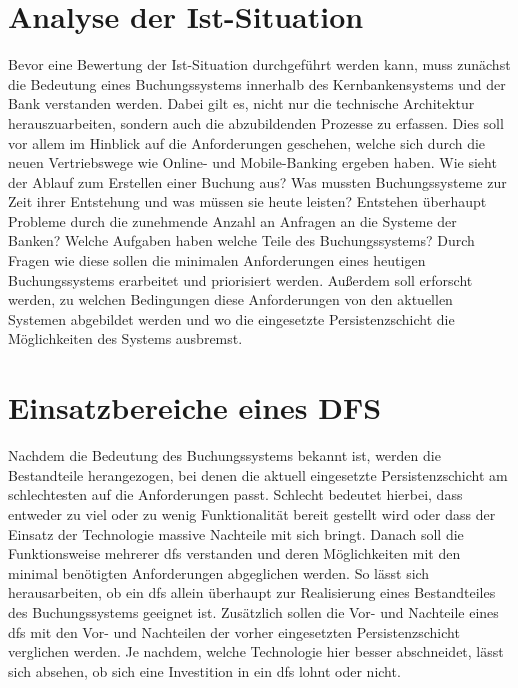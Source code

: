 \documentclass[12pt,oneside,a4paper,parskip]{scrbook}
\begin{document}
\section{Analyse der Ist-Situation}
Bevor eine Bewertung der Ist-Situation durchgeführt werden kann, muss zunächst die Bedeutung eines Buchungssystems innerhalb des Kernbankensystems und der Bank verstanden werden. Dabei gilt es, nicht nur die technische Architektur herauszuarbeiten, sondern auch die abzubildenden Prozesse zu erfassen. Dies soll vor allem im Hinblick auf die Anforderungen geschehen, welche sich durch die neuen Vertriebswege wie Online- und Mobile-Banking ergeben haben. Wie sieht der Ablauf zum Erstellen einer Buchung aus? Was mussten Buchungssysteme zur Zeit ihrer Entstehung und was müssen sie heute leisten? Entstehen überhaupt Probleme durch die zunehmende Anzahl an Anfragen an die Systeme der Banken? Welche Aufgaben haben welche Teile des Buchungssystems? Durch Fragen wie diese sollen die minimalen Anforderungen eines heutigen Buchungssystems erarbeitet und priorisiert werden. Außerdem soll erforscht werden, zu welchen Bedingungen diese Anforderungen von den aktuellen Systemen abgebildet werden und wo die eingesetzte Persistenzschicht die Möglichkeiten des Systems ausbremst.

\section{Einsatzbereiche eines DFS}
Nachdem die Bedeutung des Buchungssystems bekannt ist, werden die Bestandteile herangezogen, bei denen die aktuell eingesetzte Persistenzschicht am schlechtesten auf die Anforderungen passt. Schlecht bedeutet hierbei, dass entweder zu viel oder zu wenig Funktionalität bereit gestellt wird oder dass der Einsatz der Technologie massive Nachteile mit sich bringt. Danach soll die Funktionsweise mehrerer \ac{dfs} verstanden und deren Möglichkeiten mit den minimal benötigten Anforderungen abgeglichen werden. So lässt sich herausarbeiten, ob ein \ac{dfs} allein überhaupt zur Realisierung eines Bestandteiles des Buchungssystems geeignet ist. Zusätzlich sollen die Vor- und Nachteile eines \ac{dfs} mit den Vor- und Nachteilen der vorher eingesetzten Persistenzschicht verglichen werden. Je nachdem, welche Technologie hier besser abschneidet, lässt sich absehen, ob sich eine Investition in ein \ac{dfs} lohnt oder nicht.
\end{document}

